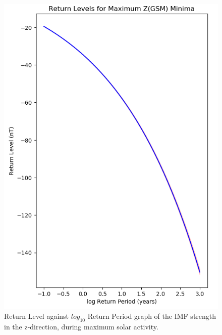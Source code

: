 \documentclass[12pt]{article}
\begin{document}
        \begin{figure}[t!]
            \begin{minipage}{0.48\textwidth}
                \centering
                \includegraphics[width=\textwidth]{fig_method/MFImaxZminReturn.png}
                \caption{Return Level against $log_{10}$ Return Period graph of the IMF strength in the z-direction, during maximum solar activity.}
                \label{fig:MFImaxZminReturn}
            \end{minipage}
            \hfill
            \begin{minipage}{0.48\textwidth}
                \centering

\end{minipage}
\end{figure}
\end{document}
